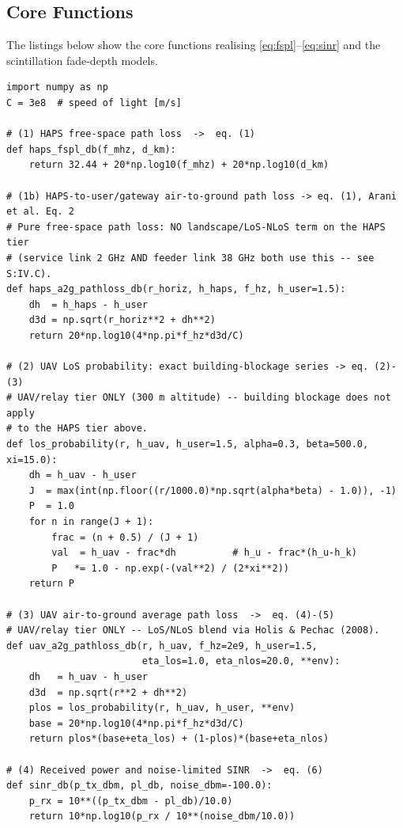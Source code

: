 \subsection{Core Functions}

The listings below show the core functions realising \eqref{eq:fspl}--\eqref{eq:sinr} and the scintillation fade-depth models.

\begin{lstlisting}[caption={Core channel-model functions},label={lst:core}]
import numpy as np
C = 3e8  # speed of light [m/s]

# (1) HAPS free-space path loss  ->  eq. (1)
def haps_fspl_db(f_mhz, d_km):
    return 32.44 + 20*np.log10(f_mhz) + 20*np.log10(d_km)

# (1b) HAPS-to-user/gateway air-to-ground path loss -> eq. (1), Arani et al. Eq. 2
# Pure free-space path loss: NO landscape/LoS-NLoS term on the HAPS tier
# (service link 2 GHz AND feeder link 38 GHz both use this -- see S:IV.C).
def haps_a2g_pathloss_db(r_horiz, h_haps, f_hz, h_user=1.5):
    dh  = h_haps - h_user
    d3d = np.sqrt(r_horiz**2 + dh**2)
    return 20*np.log10(4*np.pi*f_hz*d3d/C)

# (2) UAV LoS probability: exact building-blockage series -> eq. (2)-(3)
# UAV/relay tier ONLY (300 m altitude) -- building blockage does not apply
# to the HAPS tier above.
def los_probability(r, h_uav, h_user=1.5, alpha=0.3, beta=500.0, xi=15.0):
    dh = h_uav - h_user
    J  = max(int(np.floor((r/1000.0)*np.sqrt(alpha*beta) - 1.0)), -1)
    P  = 1.0
    for n in range(J + 1):
        frac = (n + 0.5) / (J + 1)
        val  = h_uav - frac*dh          # h_u - frac*(h_u-h_k)
        P   *= 1.0 - np.exp(-(val**2) / (2*xi**2))
    return P

# (3) UAV air-to-ground average path loss  ->  eq. (4)-(5)
# UAV/relay tier ONLY -- LoS/NLoS blend via Holis & Pechac (2008).
def uav_a2g_pathloss_db(r, h_uav, f_hz=2e9, h_user=1.5,
                        eta_los=1.0, eta_nlos=20.0, **env):
    dh   = h_uav - h_user
    d3d  = np.sqrt(r**2 + dh**2)
    plos = los_probability(r, h_uav, h_user, **env)
    base = 20*np.log10(4*np.pi*f_hz*d3d/C)
    return plos*(base+eta_los) + (1-plos)*(base+eta_nlos)

# (4) Received power and noise-limited SINR  ->  eq. (6)
def sinr_db(p_tx_dbm, pl_db, noise_dbm=-100.0):
    p_rx = 10**((p_tx_dbm - pl_db)/10.0)
    return 10*np.log10(p_rx / 10**(noise_dbm/10.0))
\end{lstlisting}


